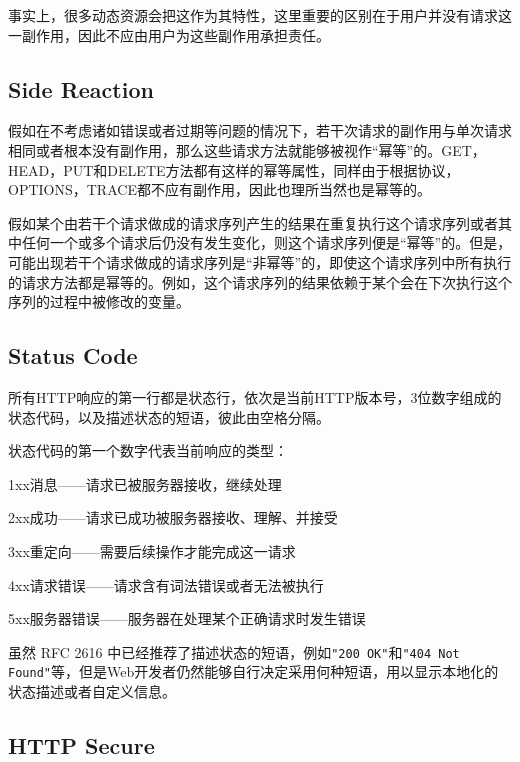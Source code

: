 事实上，很多动态资源会把这作为其特性，这里重要的区别在于用户并没有请求这一副作用，因此不应由用户为这些副作用承担责任。




\subsection{Side Reaction}


假如在不考虑诸如错误或者过期等问题的情况下，若干次请求的副作用与单次请求相同或者根本没有副作用，那么这些请求方法就能够被视作“幂等”的。GET，HEAD，PUT和DELETE方法都有这样的幂等属性，同样由于根据协议，OPTIONS，TRACE都不应有副作用，因此也理所当然也是幂等的。

假如某个由若干个请求做成的请求序列产生的结果在重复执行这个请求序列或者其中任何一个或多个请求后仍没有发生变化，则这个请求序列便是“幂等”的。但是，可能出现若干个请求做成的请求序列是“非幂等”的，即使这个请求序列中所有执行的请求方法都是幂等的。例如，这个请求序列的结果依赖于某个会在下次执行这个序列的过程中被修改的变量。


\subsection{Status Code}


所有HTTP响应的第一行都是状态行，依次是当前HTTP版本号，3位数字组成的状态代码，以及描述状态的短语，彼此由空格分隔。

状态代码的第一个数字代表当前响应的类型：

\begin{compactitem}
\item 1xx消息——请求已被服务器接收，继续处理
\item 2xx成功——请求已成功被服务器接收、理解、并接受
\item 3xx重定向——需要后续操作才能完成这一请求
\item 4xx请求错误——请求含有词法错误或者无法被执行
\item 5xx服务器错误——服务器在处理某个正确请求时发生错误
\end{compactitem}

虽然 RFC 2616 中已经推荐了描述状态的短语，例如\texttt{"200 OK"}和\texttt{"404 Not Found"}等，但是Web开发者仍然能够自行决定采用何种短语，用以显示本地化的状态描述或者自定义信息。






\subsection{HTTP Secure}

